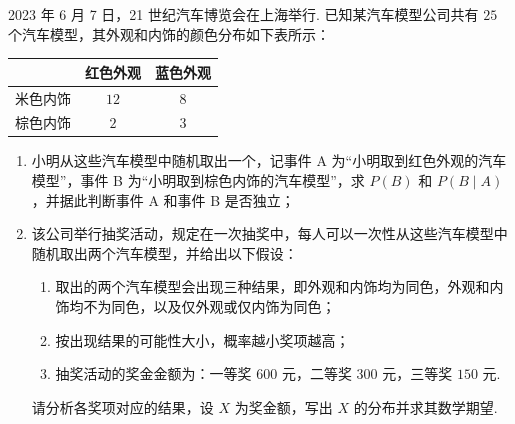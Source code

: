 \begin{problem}
2023 年 6 月 7 日，21 世纪汽车博览会在上海举行. 已知某汽车模型公司共有 \(25\) 个汽车模型，其外观和内饰的颜色分布如下表所示：

\begin{center}
\begin{tabular}{c|cc}
\hline
& 红色外观 & 蓝色外观\\
\hline
米色内饰 & \(12\) & \(8\)\\
棕色内饰 & \(2\) & \(3\)\\
\hline
\end{tabular}
\end{center}

\begin{enumerate}
\item 小明从这些汽车模型中随机取出一个，记事件 A 为“小明取到红色外观的汽车模型”，事件 B 为“小明取到棕色内饰的汽车模型”，求 \(P(B)\) 和 \(P(B\mid A)\)，并据此判断事件 A 和事件 B 是否独立；
\item 该公司举行抽奖活动，规定在一次抽奖中，每人可以一次性从这些汽车模型中随机取出两个汽车模型，并给出以下假设：
\begin{enumerate}
\item 取出的两个汽车模型会出现三种结果，即外观和内饰均为同色，外观和内饰均不为同色，以及仅外观或仅内饰为同色；
\item 按出现结果的可能性大小，概率越小奖项越高；
\item 抽奖活动的奖金金额为：一等奖 \(600\) 元，二等奖 \(300\) 元，三等奖 \(150\) 元.
\end{enumerate}
请分析各奖项对应的结果，设 \(X\) 为奖金额，写出 \(X\) 的分布并求其数学期望.
\end{enumerate}
\end{problem}

